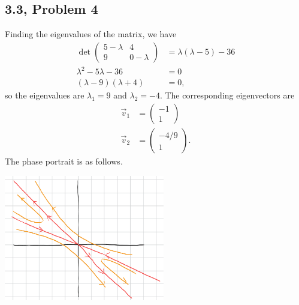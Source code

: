 \documentclass[10pt]{mypackage}
\begin{document}
\subsection{3.3, Problem 4}%
Finding the eigenvalues of the matrix, we have
\begin{align*}
  \det \begin{pmatrix}5-\lambda & 4 \\ 9 & 0-\lambda\end{pmatrix} &= \lambda\left(\lambda - 5\right) - 36\\
  \lambda^2 - 5 \lambda - 36 &= 0\\
  \left(\lambda - 9\right)\left(\lambda + 4\right) &= 0,
\end{align*}
so the eigenvalues are $\lambda_1 = 9 $ and $\lambda_2 = -4$. The corresponding eigenvectors are
\begin{align*}
  \vec{v}_1 &= \begin{pmatrix}-1\\1\end{pmatrix}\\
  \vec{v}_2 &= \begin{pmatrix}-4/9\\1\end{pmatrix}.
\end{align*}
The phase portrait is as follows.
\begin{center}
  \includegraphics[width=7cm]{images/3_3_4.png}
\end{center}
\end{document}

